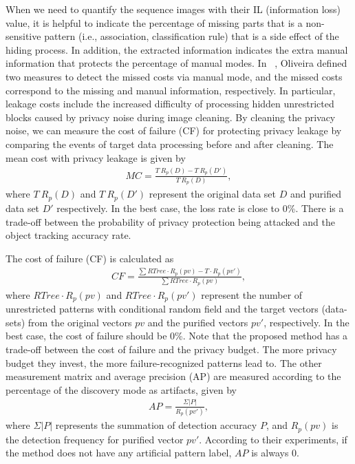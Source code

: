 \documentclass[trans]{IEEEtran}
\newcommand{\el}[1]{{\color{black}#1}}
\begin{document}
When we need to quantify the sequence images with their \el{ IL (information loss) value, it is helpful to indicate the percentage of missing parts that is a non-sensitive pattern (i.e., association, classification rule) that is a side effect of the hiding process. In addition, the extracted information indicates the extra manual information that protects the percentage of manual modes}. In ~\cite{oliveira2002privacy}, Oliveira defined two measures to detect the missed costs via manual mode, and the missed costs correspond to the missing and manual information, respectively. In particular, leakage costs include the increased difficulty of processing hidden unrestricted blocks caused by privacy noise during image cleaning. By cleaning the privacy noise, we can measure the cost of failure (CF) for protecting privacy leakage by comparing the events of target data processing before and after cleaning. The mean cost with privacy leakage is given by
\begin{eqnarray}\label{equ:MCdet}
MC = \frac{T~R_p(D)-T~R_p(D')}{T~R_p(D)},
\end{eqnarray}
where $T~R_p(D)$ and $T~R_p(D')$ represent the original data set $D$ and purified data set $D'$ respectively. In the best case, the loss rate is close to 0\%. \el{There is a trade-off between the probability of privacy protection being attacked and the object tracking accuracy rate.}

\el{
The cost of failure (CF) is calculated as}
\begin{eqnarray}\label{equ:MCdet2}
CF = \frac{ \sum{RTree \cdot R_p(pv)}-T \cdot R_p(pv')}{ \sum{RTree \cdot R_p(pv)}},
\end{eqnarray}
\el{where $RTree \cdot R_p(pv)$ and $RTree \cdot R_p(pv')$ represent the number of unrestricted patterns with conditional random field and the target vectors (data-sets) from the original vectors $pv$ and the purified vectors $pv'$, respectively. In the best case, the cost of failure should be 0\%. Note that the proposed method has a trade-off between the cost of failure and the privacy budget. The more privacy budget they invest, the more failure-recognized patterns lead to. The other measurement matrix and average precision (AP) are measured according to the percentage of the discovery mode as artifacts}, given by
\begin{eqnarray}\label{equ:APdet}
AP = \frac{\Sigma|P|}{R_p (pv')},
\end{eqnarray}
\el{ where $\Sigma|P|$ represents the summation of detection accuracy $P$, and $R_p (pv)$ is the detection frequency for purified vector $pv'$. According to their experiments, if the method does not have any artificial pattern label, $AP$ is always 0.}
\end{document}
